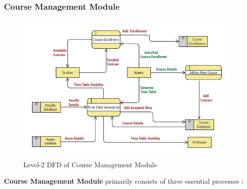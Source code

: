 \documentclass[12pt,a4paper]{article}
\begin{document}
\subsubsection{Course Management Module}
\begin{figure}[H]
    \centering
        \includegraphics[width=\linewidth]{Course_Management_DFD.png} 
    \caption{Level-2 DFD of Course Management Module}
\end{figure}
\textbf{Course Management Module} primarily consists of three essential processes :
\end{document}
